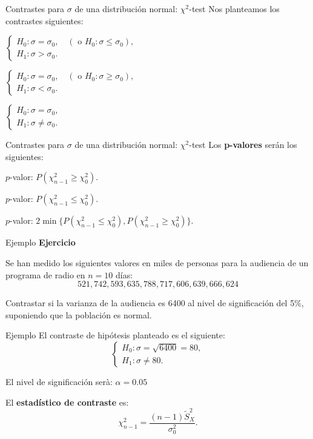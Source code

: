\documentclass[
  ignorenonframetext,
]{beamer}
\begin{document}
\begin{frame}{Contrastes para \(\sigma\) de una distribución normal:
\(\chi^2\)-test}
\protect\hypertarget{contrastes-para-sigma-de-una-distribuciuxf3n-normal-chi2-test-1}{}
Nos planteamos los contrastes siguientes:

\(\left\{\begin{array}{l} H_0:\sigma=\sigma_0, \quad (\mbox{ o } H_0:\sigma\leq \sigma_0),\\ H_1:\sigma>\sigma_0. \end{array} \right.\)

\(\left\{\begin{array}{l} H_0:\sigma=\sigma_0, \quad (\mbox{ o } H_0:\sigma\geq \sigma_0),\\ H_1:\sigma<\sigma_0. \end{array} \right.\)

\(\left\{\begin{array}{l} H_0:\sigma=\sigma_0, \\ H_1:\sigma\neq \sigma_0. \end{array} \right.\)
\end{frame}

\begin{frame}{Contrastes para \(\sigma\) de una distribución normal:
\(\chi^2\)-test}
\protect\hypertarget{contrastes-para-sigma-de-una-distribuciuxf3n-normal-chi2-test-2}{}
Los \textbf{p-valores} serán los siguientes:

\(p\)-valor: \(P(\chi^2_{n-1}\geq \chi^2_0)\).

\(p\)-valor: \(P(\chi^2_{n-1}\leq \chi^2_0)\).

\(p\)-valor:
\(2\min\big\{P(\chi_{n-1}^2\leq \chi^2_0), P(\chi_{n-1}^2\geq \chi^2_0)\big\}\).
\end{frame}

\begin{frame}{Ejemplo}
\protect\hypertarget{ejemplo-18}{}
\textbf{Ejercicio}

Se han medido los siguientes valores en miles de personas para la
audiencia de un programa de radio en \(n=10\) días: \[
521, 742, 593, 635, 788, 717, 606, 639, 666, 624
\]

Contrastar si la varianza de la audiencia es 6400 al nivel de
significación del 5\%, suponiendo que la población es normal.
\end{frame}

\begin{frame}{Ejemplo}
\protect\hypertarget{ejemplo-19}{}
El contraste de hipótesis planteado es el siguiente:
\[\left\{\begin{array}{l}
H_0:\sigma=\sqrt{6400}=80, \\
H_1:\sigma\neq 80.
\end{array}
\right.\]

El nivel de significación serà: \(\alpha=0.05\)

El \textbf{estadístico de contraste} es: \[
\chi_{n-1}^2=\frac{(n-1) \widetilde{S}_X^2}{\sigma_0^2}.
\]
\end{frame}
\end{document}
